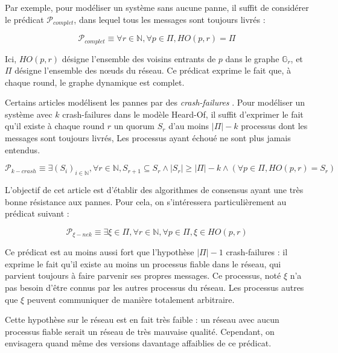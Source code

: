 \documentclass{article}
\begin{document}



Par exemple, pour modéliser un système sans aucune panne, il suffit de considérer le prédicat $\mathcal{P}_{complet}$, dans lequel tous les messages sont toujours livrés :

$$\mathcal{P}_{complet} \equiv \forall r \in \mathds{N}, \forall p \in \Pi, HO(p, r) = \Pi$$

Ici, $HO(p, r)$ désigne l'ensemble des voisins entrants de $p$ dans le graphe $\mathds{G}_r$, et $\Pi$ désigne l'ensemble des nœuds du réseau.
Ce prédicat exprime le fait que, à chaque round, le graphe dynamique est complet.

Certains articles modélisent les pannes par des \emph{crash-failures} \cite{dds}.
Pour modéliser un système avec $k$ crash-failures dans le modèle Heard-Of,
il suffit d'exprimer le fait qu'il existe à chaque round $r$ un quorum $S_r$ d'au moins $|\Pi| - k$ processus dont les messages sont toujours livrés,
Les processus ayant échoué ne sont plus jamais entendus.

$$\mathcal{P}_{k-crash} \equiv \exists (S_i)_{i \in \mathds{N}}, \forall r \in \mathds{N}, S_{r+1} \subseteq S_r \wedge |S_r| \geq |\Pi| - k \wedge (\forall p \in \Pi, HO(p, r) = S_r)$$

L'objectif de cet article est d'établir des algorithmes de consensus ayant une très bonne résistance aux pannes. Pour cela, on s'intéressera particulièrement au prédicat suivant :

$$\mathcal{P}_{\xi-nek} \equiv \exists \xi \in \Pi, \forall r \in \mathds{N}, \forall p \in \Pi, \xi \in HO(p,r)$$

Ce prédicat est au moins aussi fort que l'hypothèse $|\Pi| - 1$ crash-failures :
il exprime le fait qu'il existe au moins un processus fiable dans le réseau, qui parvient toujours à faire parvenir ses propres messages.
Ce processus, noté $\xi$ n'a pas besoin d'être connus par les autres processus du réseau.
Les processus autres que $\xi$ peuvent communiquer de manière totalement arbitraire.

Cette hypothèse sur le réseau est en fait très faible : un réseau avec aucun processus fiable serait un réseau de très mauvaise qualité. Cependant, on envisagera quand même des versions
davantage affaiblies de ce prédicat.
\end{document}
